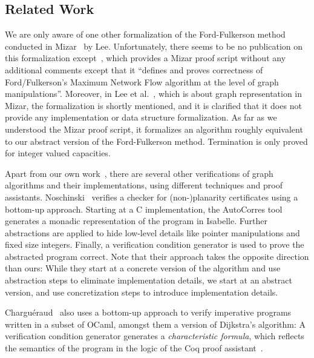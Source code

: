\documentclass[smallcondensed]{svjour3}     %
\begin{document}
  
  \subsection{Related Work}\label{sec:related_work}
  We are only aware of one other formalization of the Ford-Fulkerson method conducted in Mizar~\cite{MaRu05} by Lee. Unfortunately, there seems to be no publication
  on this formalization except~\cite{Lee05}, which provides a Mizar proof script without any additional comments except that it ``defines and proves correctness of Ford/Fulkerson's Maximum Network Flow algorithm at the level of graph manipulations''. Moreover, in Lee et al.~\cite{LeRu07}, which is about graph representation in Mizar, the formalization is shortly mentioned, and it is clarified that it does not provide any implementation or data structure formalization.
  As far as we understood the Mizar proof script, it formalizes an algorithm roughly equivalent to our abstract version of the Ford-Fulkerson method.
  Termination is only proved for integer valued capacities.
  
  Apart from our own work~\cite{La14,NoLa12}, there are several other verifications of graph algorithms and their implementations, using different techniques and proof assistants. Noschinski~\cite{Nosch15} verifies a checker for (non-)planarity certificates using a bottom-up approach. Starting at a C implementation,
  the AutoCorres tool~\cite{Greenaway15,GAK12} generates a monadic representation of the program in Isabelle. Further abstractions are applied
  to hide low-level details like pointer manipulations and fixed size integers. Finally, a verification condition
  generator is used to prove the abstracted program correct. Note that their approach takes the opposite direction than ours: While they start at a concrete version of the algorithm and use abstraction steps to eliminate implementation details, we start at an abstract version, and use concretization steps to introduce implementation details.

  Chargu\'eraud~\cite{char11} also uses a bottom-up approach to verify imperative programs written in a subset of OCaml, amongst them a version of Dijkstra's algorithm:
  A verification condition generator generates a \emph{characteristic formula}, which reflects the semantics of the program in the logic of the Coq proof assistant~\cite{BeCa10}.
  
\end{document}
